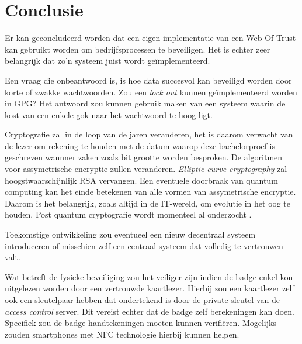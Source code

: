 
\chapter{Conclusie}
\label{ch:conclusie}


Er kan geconcludeerd worden dat een eigen implementatie van een Web Of Trust kan
gebruikt worden om bedrijfsprocessen te beveiligen. Het is echter zeer
belangrijk dat zo'n systeem juist wordt geïmplementeerd.

Een vraag die onbeantwoord is, is hoe data succesvol kan beveiligd worden door
korte of zwakke wachtwoorden. Zou een \textit{lock out} kunnen geïmplementeerd
worden in \gls{GPG}? Het antwoord zou kunnen gebruik maken van een systeem
waarin de kost van een enkele gok naar het wachtwoord te hoog ligt.

Cryptografie zal in de loop van de jaren veranderen, het is daarom verwacht
van de lezer om rekening te houden met de datum waarop deze bachelorproef is
geschreven wannner zaken zoals bit grootte worden besproken. De algoritmen voor
assymetrische encryptie zullen veranderen. \textit{Elliptic curve cryptography}
zal hoogstwaarschijnlijk RSA vervangen. Een eventuele doorbraak van quantum
computing kan het einde betekenen van alle vormen van assymetrische encryptie.
Daarom is het belangrijk, zoals altijd in de IT-wereld, om evolutie in het oog
te houden. Post quantum cryptografie wordt momenteel al onderzocht
\autocite{ANewHopeUsenix}.

Toekomstige ontwikkeling zou eventueel een nieuw decentraal systeem introduceren
of misschien zelf een centraal systeem dat volledig te vertrouwen valt.

Wat betreft de fysieke beveiliging zou het veiliger zijn indien de badge enkel
kon uitgelezen worden door een vertrouwde kaartlezer. Hierbij zou een kaartlezer
zelf ook een sleutelpaar hebben dat ondertekend is door de private sleutel van
de \textit{access control} server. Dit vereist echter dat de badge zelf
berekeningen kan doen. Specifiek zou de badge handtekeningen moeten kunnen
verifiëren. Mogelijks zouden smartphones met \gls{NFC} technologie hierbij
kunnen
helpen.
